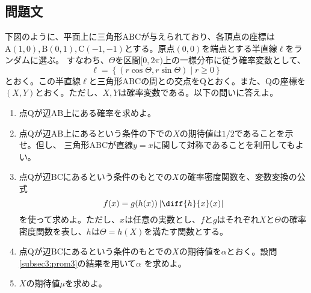 \documentclass[dvipdfmx,titlepage, 11pt, a4paper]{jsarticle}%
\begin{document}
\newpage

\section{}%
\subsection{問題文}
下図のように、平面上に三角形$\mathrm{ABC}$が与えられており、各頂点の座標は
$\mathrm{A(1, 0), B(0, 1), C(-1, -1)}$とする。原点$(0, 0)$を端点とする半直線$\ell$をランダムに選ぶ。
すなわち、$\Theta$を区間$[0, 2\pi)$上の一様分布に従う確率変数として、
\begin{equation*}
    \ell = \left\{(r\cos\Theta, r\sin\Theta) \mid r \geq 0\right\}
\end{equation*}
とおく。この半直線$\ell$と三角形$\mathrm{ABC}$の周との交点を$\mathrm{Q}$とおく。また、$\mathrm{Q}$の座標を
$(X, Y)$とおく。ただし、$X, Y$は確率変数である。以下の問いに答えよ。
\begin{enumerate}[(1)]
    \setlength{\itemsep}{10pt}
    \item 点$\mathrm{Q}$が辺$\mathrm{AB}$上にある確率を求めよ。\label{subsec3:prom1}
    \item 点$\mathrm{Q}$が辺$\mathrm{AB}$上にあるという条件の下での$X$の期待値は$1/2$であることを示せ。但し、
    三角形$\mathrm{ABC}$が直線$y = x$に関して対称であることを利用してもよい。\label{subsec3:prom2}
    \item 点$\mathrm{Q}$が辺$\mathrm{BC}$にあるという条件のもとでの$X$の確率密度関数を、変数変換の公式
    \begin{equation*}
        f(x) = g(h(x))\left\lvert \diff{h}{x}(x) \right\rvert
    \end{equation*}
    を使って求めよ。ただし、$x$は任意の実数とし、$f$と$g$はそれぞれ$X$と$\Theta$の確率密度関数を表し、$h$は$\Theta = h(X)$を満たす関数とする。\label{subsec3:prom3}
    \item 点$\mathrm{Q}$が辺$\mathrm{BC}$にあるという条件のもとでの$X$の期待値を$\alpha$とおく。設問\ref{subsec3:prom3}の結果を用いて$\alpha$
    を求めよ。\label{subsec3:prom4}
    \item $X$の期待値$\mu$を求めよ。
\end{enumerate}
\end{document}
